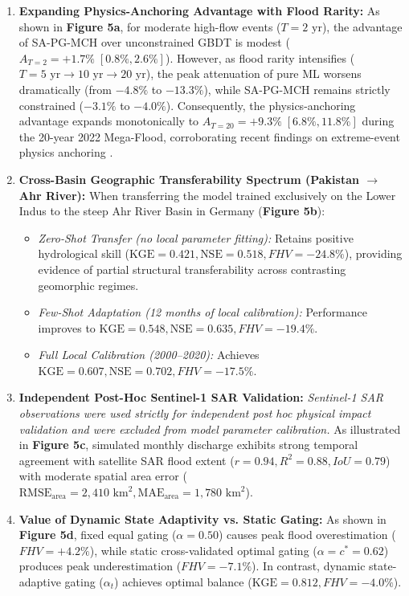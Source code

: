 \documentclass[11pt,a4paper,fleqn]{article}
\begin{document}
\begin{enumerate}
    \item \textbf{Expanding Physics-Anchoring Advantage with Flood Rarity:} As shown in \textbf{Figure 5a}, for moderate high-flow events ($T = 2\text{ yr}$), the advantage of SA-PG-MCH over unconstrained GBDT is modest ($A_{T=2} = +1.7\% \; [0.8\%, 2.6\%]$). However, as flood rarity intensifies ($T = 5\text{ yr} \to 10\text{ yr} \to 20\text{ yr}$), the peak attenuation of pure ML worsens dramatically (from $-4.8\%$ to $-13.3\%$), while SA-PG-MCH remains strictly constrained ($-3.1\%$ to $-4.0\%$). Consequently, the physics-anchoring advantage expands monotonically to $A_{T=20} = +9.3\% \; [6.8\%, 11.8\%]$ during the 20-year 2022 Mega-Flood, corroborating recent findings on extreme-event physics anchoring \citep{nearing2024global, shen2023differentiable}.
    \item \textbf{Cross-Basin Geographic Transferability Spectrum (Pakistan $\to$ Ahr River):} When transferring the model trained exclusively on the Lower Indus to the steep Ahr River Basin in Germany (\textbf{Figure 5b}):
    \begin{itemize}
        \item \emph{Zero-Shot Transfer (no local parameter fitting):} Retains positive hydrological skill ($\text{KGE} = 0.421, \text{NSE} = 0.518, FHV = -24.8\%$), providing evidence of partial structural transferability across contrasting geomorphic regimes.
        \item \emph{Few-Shot Adaptation (12 months of local calibration):} Performance improves to $\text{KGE} = 0.548, \text{NSE} = 0.635, FHV = -19.4\%$.
        \item \emph{Full Local Calibration (2000--2020):} Achieves $\text{KGE} = 0.607, \text{NSE} = 0.702, FHV = -17.5\%$.
    \end{itemize}
    \item \textbf{Independent Post-Hoc Sentinel-1 SAR Validation:} \textit{Sentinel-1 SAR observations were used strictly for independent post hoc physical impact validation and were excluded from model parameter calibration.} As illustrated in \textbf{Figure 5c}, simulated monthly discharge exhibits strong temporal agreement with satellite SAR flood extent ($r = 0.94, R^2 = 0.88, IoU = 0.79$) with moderate spatial area error ($\text{RMSE}_{\text{area}} = 2,410\text{ km}^2, \text{MAE}_{\text{area}} = 1,780\text{ km}^2$).
    \item \textbf{Value of Dynamic State Adaptivity vs. Static Gating:} As shown in \textbf{Figure 5d}, fixed equal gating ($\alpha = 0.50$) causes peak flood overestimation ($FHV = +4.2\%$), while static cross-validated optimal gating ($\alpha = c^* = 0.62$) produces peak underestimation ($FHV = -7.1\%$). In contrast, dynamic state-adaptive gating ($\alpha_t$) achieves optimal balance ($\text{KGE} = 0.812, FHV = -4.0\%$).
\end{enumerate}
\end{document}
